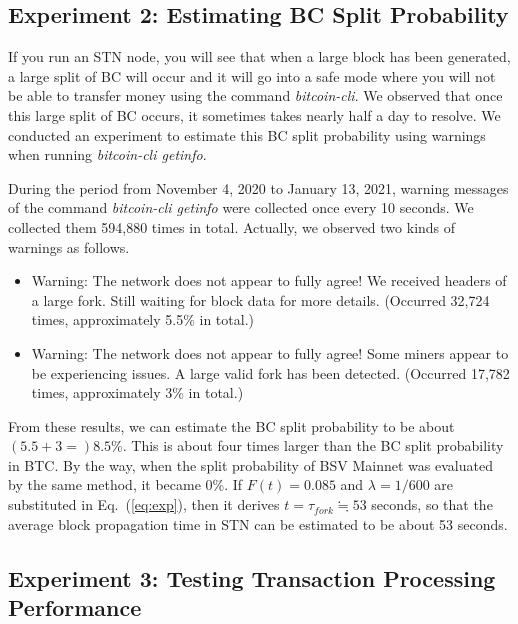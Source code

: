 \documentclass[graybox]{svmult}
\begin{document}
\subsection{Experiment 2: Estimating BC Split Probability}
\label{sec:sork}

 If you run an STN node, you will see that when a large block has been generated, a large split of BC will occur and it will go into a safe mode where you will not be able to transfer money using the command \textit{bitcoin-cli}. 
We observed that once this large split of BC occurs, it sometimes takes nearly half a day to resolve.
We conducted an experiment to estimate this BC split probability using warnings when running \textit{bitcoin-cli getinfo}.


During the period from November 4, 2020 to January 13, 2021, warning messages of the command \textit{bitcoin-cli getinfo} were collected once every 10 seconds. We collected them 594,880 times in total. 
Actually, we observed two kinds of warnings as follows.
%
\begin{itemize}
  \item Warning: The network does not appear to fully agree! We received
        headers of a large fork. Still waiting for block data for more details.
	(Occurred 32,724 times, approximately 5.5\% in total.)

  \item Warning: The network does not appear to fully agree! Some miners
        appear to be experiencing issues. A large valid fork has been detected. 
	(Occurred 17,782 times, approximately 3\% in total.)
\end{itemize}
%
From these results, we can estimate the BC split probability to be about $(5.5 + 3 =) 8.5$\%.
This is about four times larger than the BC split probability in BTC. 
By the way, when the split probability of BSV Mainnet was evaluated by the same method, it became 0\%.
If $F(t) = 0.085$ and $\lambda = 1/600$ are substituted in Eq.~(\ref{eq:exp}), then it derives $t = \tau_{fork} \fallingdotseq 53$ seconds, so that the average block propagation time in STN can be estimated to be about 53 seconds. 



\subsection{Experiment 3: Testing Transaction Processing Performance}
\label{sec:method}
\end{document}

